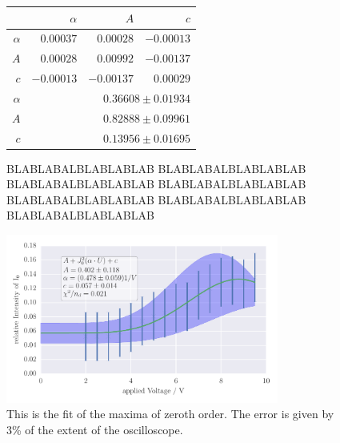 \begin{figure}
\caption{
BLABLABALBLABLABLAB
BLABLABALBLABLABLAB
BLABLABALBLABLABLAB
BLABLABALBLABLABLAB
BLABLABALBLABLABLAB
BLABLABALBLABLABLAB
BLABLABALBLABLABLAB
}
 \begin{tabular}{|r|r|r|r|}
 \hline 
\cellcolor{tabcolor}&\cellcolor{tabcolor}$\alpha$&\cellcolor{tabcolor}$A$&\cellcolor{tabcolor}$c$\\ \hline 
 \cellcolor{tabcolor}$\alpha$&$0.00037$ &$0.00028$ &$-0.00013$ \\ 
\cellcolor{tabcolor}$A$&$0.00028$ &$0.00992$ &$-0.00137$ \\ 
\cellcolor{tabcolor}$c$&$-0.00013$ &$-0.00137$ &$0.00029$ \\ \hline \hline
\cellcolor{tabcolor}$\alpha$&\multicolumn{3}{r|}{$0.36608 \pm 0.01934$ }\\ 
\cellcolor{tabcolor}$A$&\multicolumn{3}{r|}{$0.82888 \pm 0.09961$ }\\ 
\cellcolor{tabcolor}$c$&\multicolumn{3}{r|}{$0.13956 \pm 0.01695$ }\\ 
\hline
\end{tabular}
\end{figure}
\clearpage
\begin{figure}[htpb]
    \centering
    \includegraphics[width=0.8\textwidth]{analysis/figures/besselfit_003}
    \caption{This is the fit of the maxima of zeroth order. The error is given by 3\% of the extent of the oscilloscope.}
    \label{fig:besselfit_001}
\end{figure}
